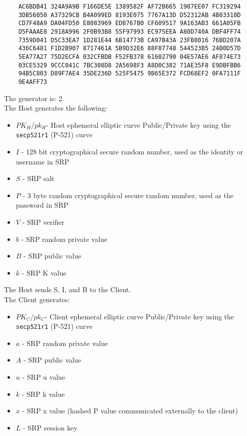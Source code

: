 \documentclass{article}
\begin{document}
    \begin{verbatim}
    AC6BDB41 324A9A9B F166DE5E 1389582F AF72B665 1987EE07 FC319294
    3DB56050 A37329CB B4A099ED 8193E075 7767A13D D52312AB 4B03310D
    CD7F48A9 DA04FD50 E8083969 EDB767B0 CF609517 9A163AB3 661A05FB
    D5FAAAE8 2918A996 2F0B93B8 55F97993 EC975EEA A80D740A DBF4FF74
    7359D041 D5C33EA7 1D281E44 6B14773B CA97B43A 23FB8016 76BD207A
    436C6481 F1D2B907 8717461A 5B9D32E6 88F87748 544523B5 24B0D57D
    5EA77A27 75D2ECFA 032CFBDB F52FB378 61602790 04E57AE6 AF874E73
    03CE5329 9CCC041C 7BC308D8 2A5698F3 A8D0C382 71AE35F8 E9DBFBB6
    94B5C803 D89F7AE4 35DE236D 525F5475 9B65E372 FCD68EF2 0FA7111F
    9E4AFF73
    \end{verbatim}

    The generator is: 2.\\

    The Host generates the following:\\

    \begin{itemize}
        \item $PK_H/pk_H$- Host ephemeral elliptic curve Public/Private
        key using the \texttt{secp521r1} (P-521) curve
        \item $I$ - 128 bit cryptographical secure random number, used as the identity or
        username in SRP
        \item $S$ - SRP salt
        \item $P$ - 3 byte random cryptographical secure random number, used as the password
        in SRP
        \item $V$ - SRP verifier
        \item $b$ - SRP random private value
        \item $B$ - SRP public value
        \item $k$ - SRP K value
    \end{itemize}
    
    The Host sends S, I, and B to the Client.\\

    The Client generates:\\

    \begin{itemize}
        \item $PK_C/pk_C$- Client ephemeral elliptic curve Public/Private
        key using the \texttt{secp521r1} (P-521) curve
        \item $a$ - SRP random private value
        \item $A$ - SRP public value
        \item $u$ - SRP u value
        \item $k$ - SRP k value
        \item $x$ - SRP x value (hashed P value communicated externally to the client)
        \item $L$ - SRP session key
    \end{itemize}
\end{document}
